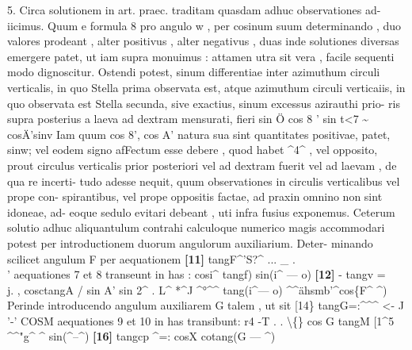 \documentclass[12pt,a4paper]{article}
\begin{document}
5.
Circa  solutionem  in  art.  praec.  traditam  quasdam  adhuc  observationes  ad-
iicimus.
Quum  e  formula  8  pro  angulo  w ,  per  cosinum  suum  determinando ,  duo
valores  prodeant ,  alter  positivus ,  alter  negativus ,  duas  inde  solutiones  diversas
emergere  patet,  ut  iam  supra  monuimus :  attamen  utra  sit  vera ,  facile  sequenti
modo  dignoscitur.  Ostendi  potest,  sinum  differentiae  inter  azimuthum  circuli
verticalis,  in  quo  Stella  prima  observata  est,  atque  azimuthum  circuli  verticaiis,
in  quo  observata  est  Stella  secunda,  sive  exactius,  sinum  excessus  azirauthi  prio-
ris  supra  posterius  a  laeva  ad  dextram  mensurati,  fieri
sin  Ö  cos  8 '  sin  t<7
\textasciitilde{}  cosÄ'sinv
Iam  quum  cos 8',  cos A'  natura  sua  sint  quantitates  positivae,  patet,  sinw;  vel
eodem  signo  afFectum  esse  debere ,  quod  habet  \^{}4\^{} ,  vel  opposito,  prout  circulus
verticalis  prior  posteriori  vel  ad  dextram  fuerit  vel  ad  laevam ,  de  qua  re  incerti-
tudo  adesse  nequit,  quum  observationes  in  circulis  verticalibus  vel  prope  con-
spirantibus,  vel  prope  oppositis  factae,  ad  praxin  omnino  non  sint  idoneae,  ad-
eoque  sedulo  evitari  debeant ,  uti  infra  fusius  exponemus.
Ceterum  solutio  adhuc  aliquantulum  contrahi  calculoque  numerico  magis
accommodari  potest  per  introductionem  duorum  angulorum  auxiliarium.  Deter-
minando scilicet  angulum  F  per  aequationem
\noindent \textbf{[11]} tangF\^{}'S?\^{}        ...  \_        .\\
'
aequationes  7   et  8   transeunt  in  has  :
cosi\^{}  tangf)
sin(i\^{}  ---  o)
\noindent \textbf{[12]} -    tangv  =\\
j.      ,      cosctangA   /  sin  A' sin  2\^{}  .
L\^{}  *\^{}J  \^{}°\^{}\^{}          tang(i\^{}--- o)  \^{}\^{}ähsmb'\^{}cos\{F\^{}        \^{})
Perinde  introducendo  angulum  auxiliarem   G  talem ,  ut  sit
[14\}  tangG=:\^{}\^{}\^{}
<-         J  '-'                         COSM
aequationes  9  et   10  in  has  transibunt:
r4  -T     .  .          \textbackslash\{\}           cos  G  tangM
[1\^{}5  \^{}\^{}"g\^{}  \^{}    sin(\^{}--\^{})
\noindent \textbf{[16]} tangcp  \^{}=:  cosX  cotang(G  ---  \^{})\\

\newpage
\end{document}
